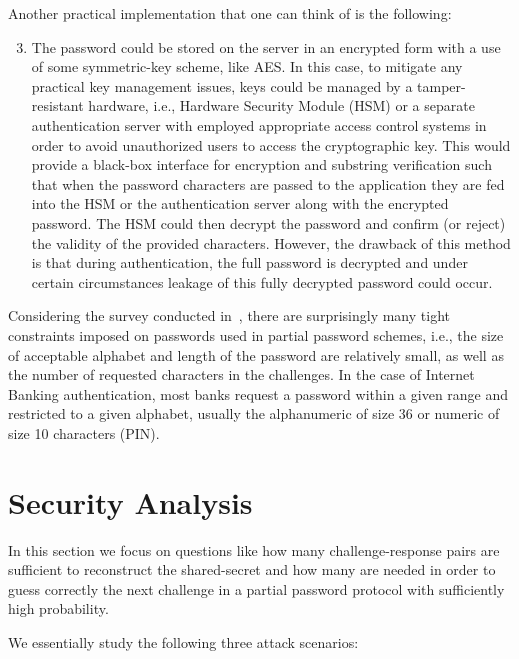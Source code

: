\documentclass{llncs}
\begin{document}

\noindent Another practical implementation that one can think of is the following:

\begin{enumerate}
\setcounter{enumi}{2}

\item The password could be stored on the server in an encrypted form with a use of some symmetric-key scheme, like AES. 
In this case, to mitigate any practical key management issues, keys could be managed by a tamper-resistant hardware, i.e., Hardware Security Module (HSM) or a separate authentication server with employed appropriate access control systems in order to avoid unauthorized users to access the cryptographic key. 
This would provide a black-box interface for encryption and substring verification such that when the password characters are passed to the application they are fed into the HSM or the 
authentication server along with the encrypted password. 
The HSM could then decrypt the password and confirm (or reject) the validity of the provided characters. 
However, the drawback of this method is that during authentication, the full password is decrypted and under certain circumstances leakage of this fully decrypted password could occur. 
\end{enumerate}


Considering the survey conducted in~\cite{FC13paper}, there are surprisingly many tight constraints imposed on passwords used in partial password schemes, i.e., the size of acceptable alphabet and length of the password are relatively small, as well as the number of requested characters in the challenges. 
In the case of Internet Banking authentication, most banks request a password within a given range 
and restricted to a given alphabet, usually the alphanumeric of size 36 or numeric of size 10 characters (PIN).



\section{Security Analysis}

In this section we focus on questions like how many challenge-response pairs are sufficient to reconstruct the shared-secret and how many are needed
in order to guess correctly the next challenge in a partial password protocol with sufficiently high probability.

We essentially study the following three attack scenarios:
\end{document}
